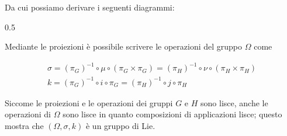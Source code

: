 {Da cui possiamo derivare i seguenti diagrammi:

	{0.5}{%
			}

Mediante le proiezioni è possibile scrivere le operazioni del gruppo $ \Omega $ come

\begin{gather}
	\sigma = (\pi_{G})^{-1} \circ \mu \circ (\pi_{G} \times \pi_{G}) %
	= (\pi_{H})^{-1} \circ \nu \circ (\pi_{H} \times \pi_{H}) \\
	k = (\pi_{G})^{-1} \circ i \circ \pi_{G} %
	= (\pi_{H})^{-1} \circ j \circ \pi_{H}
\end{gather}

Siccome le proiezioni e le operazioni dei gruppi $ G $ e $ H $ sono lisce, anche le operazioni di $ \Omega $ sono lisce in quanto composizioni di applicazioni lisce; questo mostra che $ (\Omega, \sigma, k) $ è un gruppo di Lie.
}


